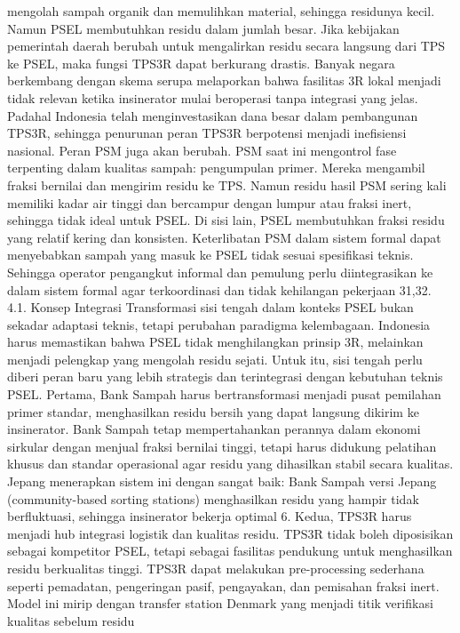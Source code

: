 \documentclass[
  letterpaper,
  DIV=11,
  numbers=noendperiod]{scrreprt}
\begin{document}
mengolah sampah organik dan memulihkan material, sehingga residunya
kecil. Namun PSEL membutuhkan residu dalam jumlah besar. Jika kebijakan
pemerintah daerah berubah untuk mengalirkan residu secara langsung dari
TPS ke PSEL, maka fungsi TPS3R dapat berkurang drastis. Banyak negara
berkembang dengan skema serupa melaporkan bahwa fasilitas 3R lokal
menjadi tidak relevan ketika insinerator mulai beroperasi tanpa
integrasi yang jelas. Padahal Indonesia telah menginvestasikan dana
besar dalam pembangunan TPS3R, sehingga penurunan peran TPS3R berpotensi
menjadi inefisiensi nasional. Peran PSM juga akan berubah. PSM saat ini
mengontrol fase terpenting dalam kualitas sampah: pengumpulan primer.
Mereka mengambil fraksi bernilai dan mengirim residu ke TPS. Namun
residu hasil PSM sering kali memiliki kadar air tinggi dan bercampur
dengan lumpur atau fraksi inert, sehingga tidak ideal untuk PSEL. Di
sisi lain, PSEL membutuhkan fraksi residu yang relatif kering dan
konsisten. Keterlibatan PSM dalam sistem formal dapat menyebabkan sampah
yang masuk ke PSEL tidak sesuai spesifikasi teknis. Sehingga operator
pengangkut informal dan pemulung perlu diintegrasikan ke dalam sistem
formal agar terkoordinasi dan tidak kehilangan pekerjaan 31,32. 4.1.
Konsep Integrasi Transformasi sisi tengah dalam konteks PSEL bukan
sekadar adaptasi teknis, tetapi perubahan paradigma kelembagaan.
Indonesia harus memastikan bahwa PSEL tidak menghilangkan prinsip 3R,
melainkan menjadi pelengkap yang mengolah residu sejati. Untuk itu, sisi
tengah perlu diberi peran baru yang lebih strategis dan terintegrasi
dengan kebutuhan teknis PSEL. Pertama, Bank Sampah harus bertransformasi
menjadi pusat pemilahan primer standar, menghasilkan residu bersih yang
dapat langsung dikirim ke insinerator. Bank Sampah tetap mempertahankan
perannya dalam ekonomi sirkular dengan menjual fraksi bernilai tinggi,
tetapi harus didukung pelatihan khusus dan standar operasional agar
residu yang dihasilkan stabil secara kualitas. Jepang menerapkan sistem
ini dengan sangat baik: Bank Sampah versi Jepang (community-based
sorting stations) menghasilkan residu yang hampir tidak berfluktuasi,
sehingga insinerator bekerja optimal 6. Kedua, TPS3R harus menjadi hub
integrasi logistik dan kualitas residu. TPS3R tidak boleh diposisikan
sebagai kompetitor PSEL, tetapi sebagai fasilitas pendukung untuk
menghasilkan residu berkualitas tinggi. TPS3R dapat melakukan
pre-processing sederhana seperti pemadatan, pengeringan pasif,
pengayakan, dan pemisahan fraksi inert. Model ini mirip dengan transfer
station Denmark yang menjadi titik verifikasi kualitas sebelum residu
\end{document}
